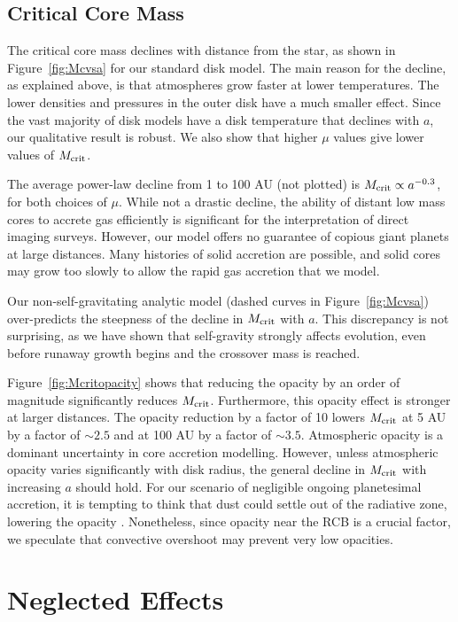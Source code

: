 \documentclass[apj, numberedappendix]{emulateapj}
\newcommand{\Fig}[1]{Figure~\ref{#1}}
\newcommand{\MC}{M_{\rm crit}}
\begin{document}
\subsection{Critical Core Mass}
\label{sec:critcore}

The critical core mass declines with distance from the star, as shown in \Fig{fig:Mcvsa} for our standard disk model.   The main reason for the decline, as explained above, is that atmospheres grow faster at lower temperatures.  The lower densities and pressures in the outer disk have a much smaller effect.  Since the vast majority of disk models have a disk temperature that declines with $a$, our qualitative result is robust.   We also show that higher $\mu$ values give lower values of $\MC$.

The average power-law decline from 1 to 100 AU (not plotted) is $\MC \propto a^{-0.3}$, for both choices of $\mu$.   While not a drastic decline, the ability of distant low mass cores to accrete gas efficiently is significant for the interpretation of direct imaging surveys.  However, our model offers no guarantee of copious giant planets at large distances.  Many histories of solid accretion are possible, and solid cores may grow too slowly to allow the rapid gas accretion that we model.  

Our non-self-gravitating analytic model (dashed curves in \Fig{fig:Mcvsa}) over-predicts the steepness of the decline in $\MC$ with $a$.  This discrepancy is not surprising, as we have shown that self-gravity strongly affects evolution, even before runaway growth begins and the crossover mass is reached.

\Fig{fig:Mcritopacity} shows that reducing the opacity by an order of magnitude significantly reduces $\MC$.  Furthermore, this opacity effect is stronger at larger distances.  The opacity reduction by a factor of 10 lowers $\MC$ at 5 AU by a factor of $\sim$$2.5$ and at 100 AU by a factor of $\sim$$3.5$.  Atmospheric opacity is a dominant uncertainty in core accretion modelling.  However, unless atmospheric opacity varies significantly with disk radius, the general decline in $\MC$ with increasing $a$ should hold.  For our scenario of negligible ongoing planetesimal accretion, it is tempting to think that dust could settle out of the radiative zone, lowering the opacity \citep{podolak03}.  Nonetheless, since opacity near the RCB is a crucial factor, we speculate that convective overshoot may prevent very low opacities.

\section{Neglected Effects}\label{sec:neglected}
\end{document}
